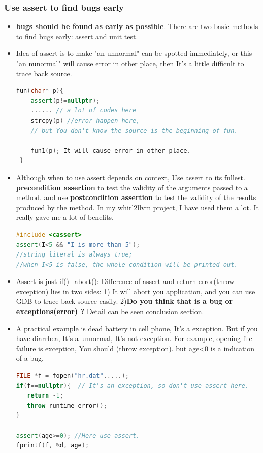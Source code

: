 \documentclass[a4paper,12pt,twoside]{book}
\begin{document}
\subsubsection{Use assert to find bugs early}
\begin{itemize}
\item \textbf{bugs should be found as early as possible}. There are two basic methods to find bugs early: assert and unit test.
\item Idea of assert is to make "an unnormal" can be spotted immediately, or this "an nunormal" will cause error in other place, then It's a little difficult to trace back source.
\begin{lstlisting}[frame=single, language=c++]
 fun(char* p){
    assert(p!=nullptr);
    ...... // a lot of codes here
    strcpy(p) //error happen here,
    // but You don't know the source is the beginning of fun.

    fun1(p); It will cause error in other place.
 }
\end{lstlisting}

\item Although when to use assert depends on context, Use assert to its fullest. \textbf{precondition assertion} to test the validity of the arguments passed to a method. and use \textbf{postcondition assertion} to test the validity of the results produced by the method.  In my whirl2llvm project, I have used them a lot. It really gave me a lot of benefits.
\begin{lstlisting}[frame=single, language=c++]
#include <cassert>
assert(I<5 && "I is more than 5");
//string literal is always true;
//when I<5 is false, the whole condition will be printed out.
\end{lstlisting}


\item Assert is just if()+abort(): Difference of assert and return error(throw exception)  lies in two sides: 1) It will abort you application, and you can use GDB to trace back source easily. 2)\textbf{Do you think that is a bug or  exceptions(error) ?} Detail can be seen conclusion section.

\item A practical example is dead battery in cell phone, It's a exception. But if you have diarrhea, It's a unnormal, It's not exception. For example, opening file failure is exception, You should (throw exception). but age<0 is a indication of a bug.
\begin{lstlisting}[frame=single, language=c++]
FILE *f = fopen("hr.dat".....);
if(f==nullptr){  // It's an exception, so don't use assert here.
   return -1;
   throw runtime_error();
}

assert(age>=0); //Here use assert.
fprintf(f, %d, age);
\end{lstlisting}

\end{itemize}
\end{document}
